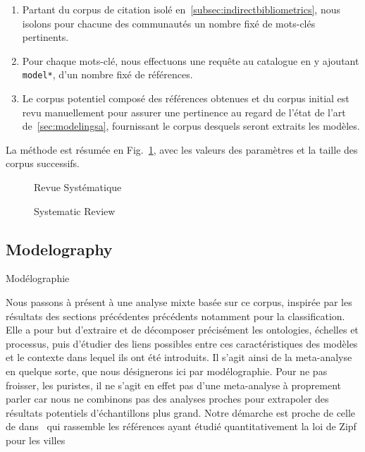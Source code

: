 \begin{enumerate}
\item Partant du corpus de citation isolé en~\ref{subsec:indirectbibliometrics}, nous isolons pour chacune des communautés un nombre fixé de mots-clés pertinents.
\item Pour chaque mots-clé, nous effectuons une requête au catalogue en y ajoutant \texttt{model*}, d'un nombre fixé de références.
\item Le corpus potentiel composé des références obtenues et du corpus initial est revu manuellement pour assurer une pertinence au regard de l'état de l'art de~\ref{sec:modelingsa}, fournissant le corpus desquels seront extraits les modèles.
\end{enumerate}


La méthode est résumée en Fig.~\ref{fig:modelography:systematicreview}, avec les valeurs des paramètres et la taille des corpus successifs. 


\begin{figure}
%
\caption{Systematic Review}{Revue Systématique}
\label{fig:modelography:systematicreview}
\end{figure}







\subsection{Modelography}{Modélographie}


Nous passons à présent à une analyse mixte basée sur ce corpus, inspirée par les résultats des sections précédentes précédents notamment pour la classification. Elle a pour but d'extraire et de décomposer précisément les ontologies, échelles et processus, puis d'étudier des liens possibles entre ces caractéristiques des modèles et le contexte dans lequel ils ont été introduits. Il s'agit ainsi de la meta-analyse en quelque sorte, que nous désignerons ici par modélographie. Pour ne pas froisser, les puristes, il ne s'agit en effet pas d'une meta-analyse à proprement parler car nous ne combinons pas des analyses proches pour extrapoler des résultats potentiels d'échantillons plus grand. Notre démarche est proche de celle de  dans~\cite{2016arXiv160606162C} qui rassemble les références ayant étudié quantitativement la loi de Zipf pour les villes


